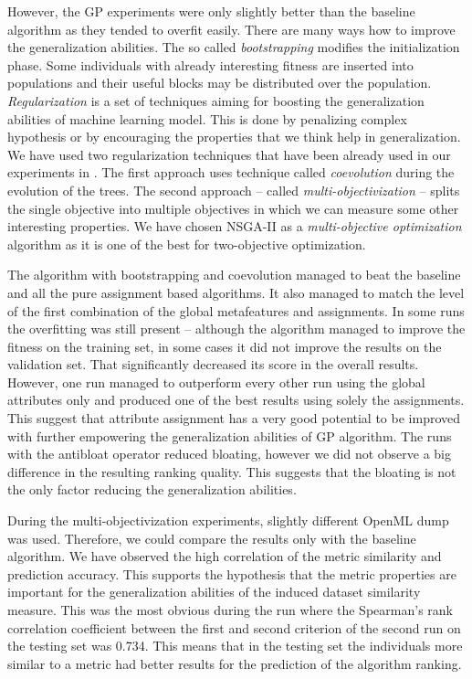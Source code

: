 \documentclass{article}
\begin{document}
\begin{refsegment}
However, the GP experiments were only slightly better than the baseline algorithm as they tended to overfit easily. There are many ways how to improve the generalization abilities. The so called \emph{bootstrapping} modifies the initialization phase. Some individuals with already interesting fitness are inserted into populations and their useful blocks may be distributed over the population.
\emph{Regularization} \cite{LearningFromData} is a set of techniques aiming for boosting the generalization abilities of machine learning model. This is done by penalizing complex hypothesis or by encouraging the properties that we think help in generalization. We have used two regularization techniques that have been already used in our experiments in \cite{jaCEC2015,jaSSCI2015}. The first approach uses technique called \emph{coevolution} during the evolution of the trees. The second approach -- called \emph{multi-objectivization} -- splits the single objective into multiple objectives in which we can measure some other interesting properties. We have chosen NSGA-II as a \emph{multi-objective optimization} algorithm as it is one of the best for two-objective optimization. 

The algorithm with bootstrapping and coevolution managed to beat the baseline and all the pure assignment based algorithms. It also managed to match the level of the first combination of the global metafeatures and assignments. In some runs the overfitting was still present -- although the algorithm managed to improve the fitness on the training set, in some cases it did not improve the results on the validation set. That significantly decreased its score in the overall results. However, one run managed to outperform every other run using the global attributes only and produced one of the best results using solely the assignments. This suggest that attribute assignment has a very good potential to be improved with further empowering the generalization abilities of GP algorithm.
The runs with the antibloat operator reduced bloating, however we did not observe a big difference in the resulting ranking quality. This suggests that the bloating is not the only factor reducing the generalization abilities.

During the multi-objectivization experiments, slightly different OpenML dump was used. Therefore, we could compare the results only with the baseline algorithm. We have observed the high
correlation of the metric similarity and prediction accuracy. This supports the
hypothesis that the metric properties are important for the generalization abilities
of the induced dataset similarity measure. This was the most obvious during the
run where the Spearman’s rank correlation coefficient between the first and second criterion
of the second run on the testing set was 0.734. This means that in the testing
set the individuals more similar to a metric had better results for the prediction
of the algorithm ranking.


\end{refsegment}
\end{document}
